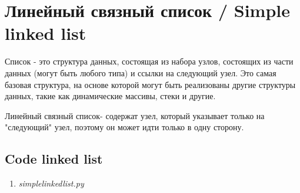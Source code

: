
\section{Линейный связный список / Simple linked list}

Список - это структура данных, состоящая из набора узлов,
состоящих из части данных (могут быть любого типа) и ссылки на
следующий узел. Это самая базовая структура, на основе которой могут
быть реализованы другие структуры данных, такие как динамические
массивы, стеки и другие.

Линейный связный список- содержат узел, который указывает только
на "следующий" узел, поэтому он может идти только в одну сторону.


\subsection{Code linked list}

\begin{enumerate}

  \item \textit{simplelinkedlist.py}

  

\end{enumerate}
